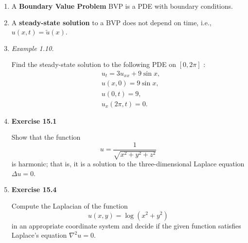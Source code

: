 \begin{enumerate}
\begin{itemize}
\end{itemize}


\item A \textbf{Boundary Value Problem} BVP is a PDE with boundary conditions.


\item A \textbf{steady-state solution} to a BVP does not depend on time, i.e., $u(x,t)=\tilde u (x)$.

\item \textit{Example 1.10.}

Find the steady-state solution to the following PDE on $[0, 2\pi]$ :
\begin{align*}
    & u_{ t} = 3u _{xx} + 9 \sin x, \\
    & u(x, 0) = 9 \sin x, \\
    & u(0, t) = 9, \\
    & u _{x} (2\pi, t) = 0.
\end{align*}

\newpage

\item \textbf{Exercise 15.1}

Show that the function
\[u = \frac{1}{\sqrt{x^{2}+y^{2}+z^{2}}}\]
is harmonic; that is, it is a solution to the three-dimensional Laplace equation $\Delta u = 0$.

\newpage

\item \textbf{Exercise 15.4}

Compute the Laplacian of the function
\[u(x,y)=\log\left( x^{2} +y^{2}\right)\]
in an appropriate coordinate system and decide if the given function satisfies Laplace's equation $\nabla ^{2} u = 0$.


\end{enumerate}



